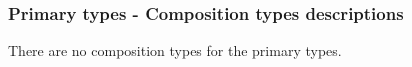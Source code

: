 \subsubsection{Primary types - Composition types descriptions}



There are no composition types for the primary types.

